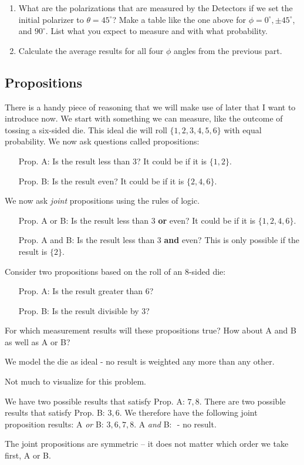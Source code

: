 \begin{exercise}
\label{exercise:rotatedhwp}
\begin{enumerate}
\item What are the polarizations that are measured by the  Detectors if we set the initial polarizer to $\theta=45^\circ$? Make a table like the one above for $\phi = 0^\circ, \pm 45^\circ$, and $90^\circ$. List what you expect to measure and with what probability.

\item Calculate the average results for all four $\phi$ angles from the previous part.
\end{enumerate}
\end{exercise}

\subsection{Propositions}
There is a handy piece of reasoning that we will make use of later that I want to introduce now. We start with something we can measure, like the outcome of tossing a six-sided die. This ideal die will roll $\{1,2,3,4,5,6\}$ with equal probability. We now ask questions called propositions:
\begin{itemize}
\item[Prop. A:] Is the result less than 3? It could be if it is $\{1,2\}$.
\item[Prop. B:] Is the result even? It could be if it is $\{2,4,6\}$.
\end{itemize}
We now ask {\em joint} propositions using the rules of logic.
\begin{itemize}
\item[Prop. A or B:] Is the result less than 3 {\bf or} even?  It could be if it is $\{1,2,4,6\}$.
\item[Prop. A and B:] Is the result less than 3 {\bf and} even? This is only possible if the result is $\{2\}$.
\end{itemize}

\begin{example}
Consider two propositions based on the roll of an 8-sided die:
\begin{itemize}
\item[Prop. A:] Is the result greater than 6?
\item[Prop. B:] Is the result divisible by 3?
\end{itemize}
For which measurement results will these propositions true? How about A and B as well as A or B?

\model We model the die as ideal - no result is weighted any more than any other.

\vis Not much to visualize for this problem.

\sol We have two possible results that satisfy Prop. A: ${7,8}$. There are two possible results that satisfy Prop. B: ${3,6}$. We therefore have the following joint proposition results: A {\em or} B: ${3,6,7,8}$. A {\em and} B: ${}$ - no result.

\assess The joint propositions are symmetric -- it does not matter which order we take first, A or B.

\end{example}

